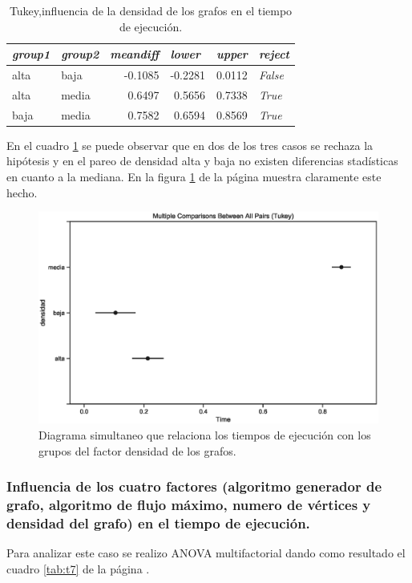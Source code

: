 \documentclass{article}
\begin{document}
\begin{table}[htbp]
  \centering
  \caption{Tukey,influencia de la densidad de los grafos en el tiempo de ejecución.}
    \begin{tabular}{llrrrl}
    \toprule
    \textit{\textbf{group1}} & \textit{\textbf{group2}} & \multicolumn{1}{l}{\textit{\textbf{meandiff}}} & \multicolumn{1}{l}{\textit{\textbf{lower}}} & \multicolumn{1}{l}{\textit{\textbf{upper}}} & \textit{\textbf{reject}} \\
    \midrule
    alta  & baja  & -0.1085 & -0.2281 & 0.0112 & \textit{False} \\
    alta  & media & 0.6497 & 0.5656 & 0.7338 & \textit{True} \\
    baja  & media & 0.7582 & 0.6594 & 0.8569 & \textit{True} \\
    \bottomrule
    \end{tabular}%
  \label{tab:t6}%
\end{table}%
En el cuadro \ref{tab:t6} se puede observar que en dos de los tres casos se rechaza la hipótesis y en el pareo de densidad alta y baja no existen diferencias stadísticas en cuanto a la mediana. En la figura \ref{fig9} de la página \pageref{fig9} muestra claramente este hecho.
\begin{center}
\begin{figure}[htbp]
\includegraphics[scale=0.6]{simultaneoustukeydensidad.eps}
\caption{Diagrama simultaneo que relaciona los tiempos de ejecución con los grupos del factor densidad de los grafos.}
\label{fig9}
\end{figure}
\end{center}
\subsubsection{Influencia de los cuatro factores (algoritmo generador de grafo, algoritmo de flujo máximo, numero de vértices y densidad del grafo) en el tiempo de ejecución.}
Para analizar este caso se realizo ANOVA multifactorial dando como resultado el cuadro \ref{tab:t7} de la página \pageref{tab:t7}.
\end{document}
